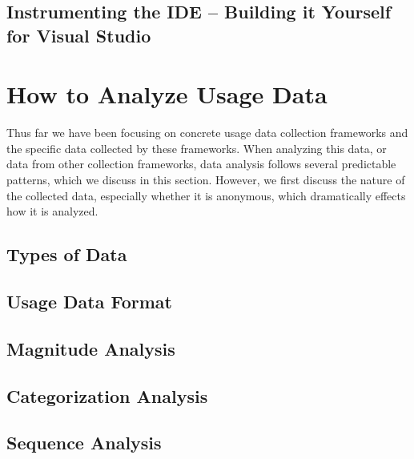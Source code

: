 

\subsection{Instrumenting the IDE -- Building it Yourself for Visual Studio} 
\label{buildItYourself}





\section{How to Analyze Usage Data}

Thus far we have been focusing on concrete usage data collection frameworks and the specific data collected by these frameworks. When analyzing this data, or data from other collection frameworks, data analysis follows several predictable patterns, which we discuss in this section. However, we first discuss the nature of the collected data, especially whether it is anonymous, which dramatically effects how it is analyzed.

\subsection{Types of Data}



\subsection{Usage Data Format}


\subsection{Magnitude Analysis}


\subsection{Categorization Analysis}


\subsection{Sequence Analysis}



